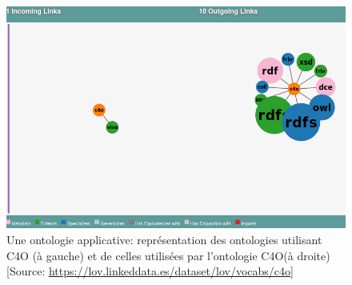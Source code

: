 \begin{figure}[!h]
	\centering
	\includegraphics[width=14cm]{images/onto_c4o.png}
	\caption[Une ontologie applicative: C4O]{Une ontologie applicative: représentation des ontologies utilisant C4O (à gauche) et de celles utilisées par l'ontologie C4O(à droite) [Source: \url{https://lov.linkeddata.es/dataset/lov/vocabs/c4o}]}
	\label{onto_c4o}
\end{figure}